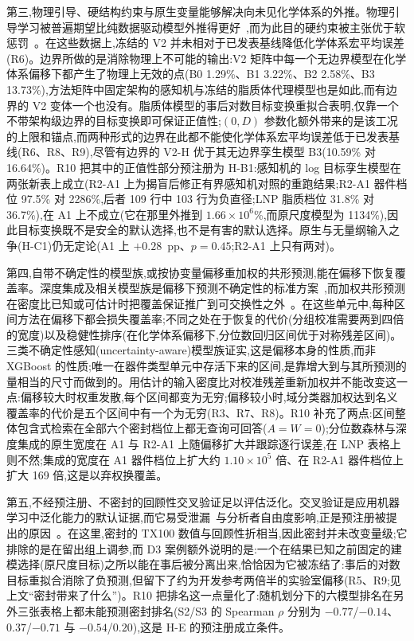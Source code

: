 \documentclass[11pt,a4paper]{ctexart}
\begin{document}
第三,物理引导、硬结构约束与原生变量能够解决向未见化学体系的外推。物理引导学习被普遍期望比纯数据驱动模型外推得更好~\cite{karniadakis2021,willard2022},而为此目的硬约束被主张优于软惩罚~\cite{naturecs2021,lu2021,beucler2021}。在这些数据上,冻结的 V2 并未相对于已发表基线降低化学体系宏平均误差(R6)。边界所做的是消除物理上不可能的输出:V2 矩阵中每一个无边界模型在化学体系偏移下都产生了物理上无效的点(B0 1.29\%、B1 3.22\%、B2 2.58\%、B3 13.73\%),方法矩阵中固定架构的感知机与冻结的脂质体代理模型也是如此,而有边界的 V2 变体一个也没有。脂质体模型的事后对数目标变换重拟合表明,仅靠一个不带架构级边界的目标变换即可保证正值性;$(0,D)$ 参数化额外带来的是该工况的上限和锚点,而两种形式的边界在此都不能使化学体系宏平均误差低于已发表基线(R6、R8、R9),尽管有边界的 V2-H 优于其无边界孪生模型 B3(10.59\% 对 16.64\%)。R10 把其中的正值性部分预注册为 \mbox{H-B1}:感知机的 log 目标孪生模型在两张新表上成立(R2-A1 上为揭盲后修正有界感知机对照的重跑结果;R2-A1 器件档位 97.5\% 对 2286\%,后者 109 行中 103 行为负直径;LNP 脂质档位 31.8\% 对 36.7\%),在 A1 上不成立(它在那里外推到 $1.66\times10^{6}$\%,而原尺度模型为 1134\%),因此目标变换既不是安全的默认选择,也不是有害的默认选择。原生与无量纲输入之争(\mbox{H-C1})仍无定论(A1 上 $+0.28$~pp、$p=0.45$;R2-A1 上只有两对)。

第四,自带不确定性的模型族,或按协变量偏移重加权的共形预测,能在偏移下恢复覆盖率。深度集成及相关模型族是偏移下预测不确定性的标准方案~\cite{lakshminarayanan2017,ovadia2019},而加权共形预测在密度比已知或可估计时把覆盖保证推广到可交换性之外~\cite{tibshirani2019,barber2023}。在这些单元中,每种区间方法在偏移下都会损失覆盖率;不同之处在于恢复的代价(分组校准需要两到四倍的宽度)以及稳健性排序(在化学体系偏移下,分位数回归区间优于对称残差区间)。三类不确定性感知(uncertainty-aware)模型族证实,这是偏移本身的性质,而非 XGBoost 的性质;唯一在器件类型单元中存活下来的区间,是靠增大到与其所预测的量相当的尺寸而做到的。用估计的输入密度比对校准残差重新加权并不能改变这一点:偏移较大时权重发散,每个区间都变为无穷;偏移较小时,域分类器加权达到名义覆盖率的代价是五个区间中有一个为无穷(R3、R7、R8)。R10 补充了两点:区间整体包含式检索在全部六个密封档位上都无查询可回答($A=W=0$);分位数森林与深度集成的原生宽度在 A1 与 R2-A1 上随偏移扩大并跟踪逐行误差,在 LNP 表格上则不然;集成的宽度在 A1 器件档位上扩大约 $1.10\times10^{5}$ 倍、在 R2-A1 器件档位上扩大 169 倍,这是以弃权换覆盖。

第五,不经预注册、不密封的回顾性交叉验证足以评估泛化。交叉验证是应用机器学习中泛化能力的默认证据,而它易受泄漏~\cite{kapoor2023}与分析者自由度影响,正是预注册被提出的原因~\cite{hofman2023,vepa2026}。在这里,密封的 TX100 数值与回顾性折相当,因此密封并未改变量级;它排除的是在留出组上调参,而 D3 案例额外说明的是:一个在结果已知之前固定的建模选择(原尺度目标)之所以能在事后被分离出来,恰恰因为它被冻结了:事后的对数目标重拟合消除了负预测,但留下了约为开发参考两倍半的实验室偏移(R5、R9;见上文“密封带来了什么”)。R10 把排名这一点量化了:随机划分下的六模型排名在另外三张表格上都未能预测密封排名(S2/S3 的 Spearman $\rho$ 分别为 $-0.77$/$-0.14$、$0.37$/$-0.71$ 与 $-0.54$/$0.20$),这是 H-E 的预注册成立条件。
\end{document}
